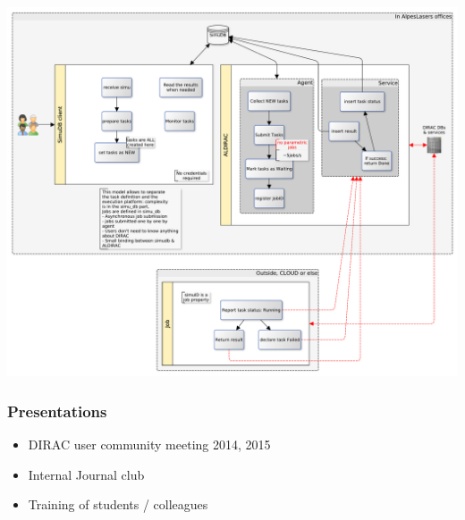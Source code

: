 \documentclass[14pt]{beamer}
\begin{document}
\begin{frame}
\centering
\includegraphics[width=\textwidth]{Architecture1}

\end{frame}

\begin{frame}
\frametitle{Presentations}
\begin{itemize}
\item DIRAC user community meeting 2014, 2015
\item Internal Journal club
\item Training of students / colleagues 
\end{itemize}
\end{frame}
\end{document}
